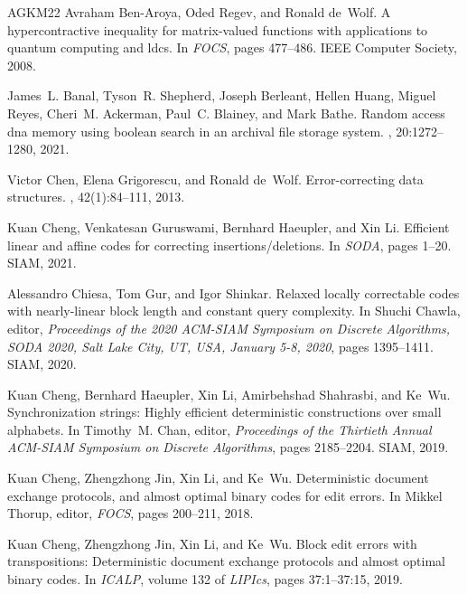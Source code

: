 \documentclass[10pt,a4paper]{article}
\theoremstyle{remark}
\begin{document}
\begin{thebibliography}{AGKM22}
Avraham Ben{-}Aroya, Oded Regev, and Ronald de~Wolf.
\newblock A hypercontractive inequality for matrix-valued functions with
  applications to quantum computing and ldcs.
\newblock In {\em {FOCS}}, pages 477--486. {IEEE} Computer Society, 2008.

James~L. Banal, Tyson~R. Shepherd, Joseph Berleant, Hellen Huang, Miguel Reyes,
  Cheri~M. Ackerman, Paul~C. Blainey, and Mark Bathe.
\newblock Random access dna memory using boolean search in an archival file
  storage system.
, 20:1272--1280, 2021.

Victor Chen, Elena Grigorescu, and Ronald de~Wolf.
\newblock Error-correcting data structures.
, 42(1):84--111, 2013.

Kuan Cheng, Venkatesan Guruswami, Bernhard Haeupler, and Xin Li.
\newblock Efficient linear and affine codes for correcting
  insertions/deletions.
\newblock In {\em {SODA}}, pages 1--20. {SIAM}, 2021.

Alessandro Chiesa, Tom Gur, and Igor Shinkar.
\newblock Relaxed locally correctable codes with nearly-linear block length and
  constant query complexity.
\newblock In Shuchi Chawla, editor, {\em Proceedings of the 2020 {ACM-SIAM}
  Symposium on Discrete Algorithms, {SODA} 2020, Salt Lake City, UT, USA,
  January 5-8, 2020}, pages 1395--1411. {SIAM}, 2020.

Kuan Cheng, Bernhard Haeupler, Xin Li, Amirbehshad Shahrasbi, and Ke~Wu.
\newblock Synchronization strings: Highly efficient deterministic constructions
  over small alphabets.
\newblock In Timothy~M. Chan, editor, {\em Proceedings of the Thirtieth Annual
  {ACM-SIAM} Symposium on Discrete Algorithms}, pages 2185--2204. {SIAM}, 2019.

Kuan Cheng, Zhengzhong Jin, Xin Li, and Ke~Wu.
\newblock Deterministic document exchange protocols, and almost optimal binary
  codes for edit errors.
\newblock In Mikkel Thorup, editor, {\em {FOCS}}, pages 200--211, 2018.

Kuan Cheng, Zhengzhong Jin, Xin Li, and Ke~Wu.
\newblock Block edit errors with transpositions: Deterministic document
  exchange protocols and almost optimal binary codes.
\newblock In {\em {ICALP}}, volume 132 of {\em LIPIcs}, pages 37:1--37:15,
  2019.


\end{thebibliography}
\end{document}
